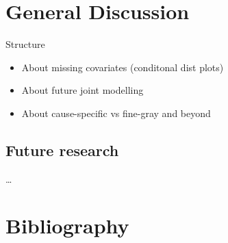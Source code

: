 \documentclass[
  letterpaper,
  DIV=11,
  numbers=noendperiod]{scrreprt}
\begin{document}

\hypertarget{general-discussion}{%
\chapter{General Discussion}\label{general-discussion}}

Structure

\begin{itemize}
\item
  About missing covariates (conditonal dist plots)
\item
  About future joint modelling
\item
  About cause-specific vs fine-gray and beyond
\end{itemize}

\hypertarget{future-research}{%
\section{Future research}\label{future-research}}

\ldots{}


\hypertarget{bibliography}{%
\chapter*{Bibliography}\label{bibliography}}

\end{document}
